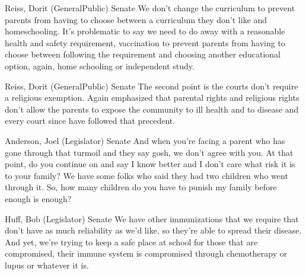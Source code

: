 \begin{result}{7.032216048716612}{Reiss, Dorit (GeneralPublic) Senate}
We don't change the curriculum to prevent parents from having to choose between a curriculum they don't like and homeschooling. It's problematic to say we need to do away with a reasonable health and safety requirement, vaccination to prevent parents from having to choose between following the requirement and choosing another educational option, again, home schooling or independent study.
\end{result}

\begin{result}{6.846770329405164}{Reiss, Dorit (GeneralPublic) Senate}
The second point is the courts don't require a religious exemption. Again emphasized that parental rights and religious rights don't allow the parents to expose the community to ill health and to disease and every court since have followed that precedent.
\end{result}

\begin{result}{6.547916404088606}{Anderson, Joel (Legislator) Senate}
And when you're facing a parent who has gone through that turmoil and they say gosh, we don't agree with you. At that point, do you continue on and say I know better and I don't care what risk it is to your family? We have some folks who said they had two children who went through it. So, how many children do you have to punish my family before enough is enough?
\end{result}

\begin{result}{6.444506986525054}{Huff, Bob (Legislator) Senate}
We have other immunizations that we require that don't have as much reliability as we'd like, so they're able to spread their disease. And yet, we're trying to keep a safe place at school for those that are compromised, their immune system is compromised through chemotherapy or lupus or whatever it is.
\end{result}

